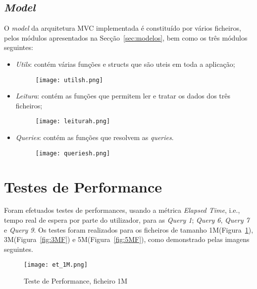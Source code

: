 \documentclass{article}
\begin{document}
\subsection{\textit{Model}}

O \textit{model} da arquitetura MVC implementada é constituído por vários ficheiros, pelos módulos apresentados na Secção~\ref{sec:modelos}, bem como os três módulos seguintes: 

\begin{itemize}

\item \textit{Utils}: contém várias funções e structs que são uteis em toda a aplicação;

\begin{figure}[H]
\texttt{[image: utilsh.png]}
\centering
\end{figure}

\item \textit{Leitura}: contém as funções que permitem ler e tratar os dados dos três ficheiros;

\begin{figure}[H]
\texttt{[image: leiturah.png]}
\centering
\end{figure}

\item \textit{Queries}: contém as funções que resolvem as \textit{queries}.

\begin{figure}[H]
\texttt{[image: queriesh.png]}
\centering
\end{figure}
\end{itemize}

\newpage
\section{Testes de Performance}\label{sec:performance}

Foram efetuados testes de performances, usando a métrica \textit{Elapsed Time}, i.e., tempo real de espera por parte do utilizador, para as \textit{Query 1}; \textit{Query 6}, \textit{Query 7} e \textit{Query 9}. Os testes foram realizados para os ficheiros de tamanho 1M(Figura~\ref{fig:1MF}), 3M(Figura~\ref{fig:3MF}) e 5M(Figura~\ref{fig:5MF}), como demonstrado pelas imagens seguintes. 

\begin{figure}[H]
\texttt{[image: et\_1M.png]}
\centering
\caption{Teste de Performance, ficheiro 1M\label{fig:1MF}}
\end{figure}
\end{document}
